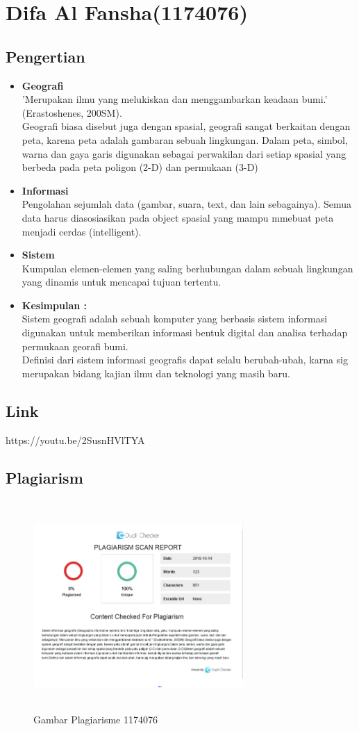 \section{Difa Al Fansha(1174076)}
\subsection{Pengertian}
\begin{itemize}
	\item \textbf{Geografi} \\
	'Merupakan ilmu yang melukiskan dan menggambarkan keadaan bumi.' \\ 
(Erastoshenes, 200SM). \\ 
Geografi biasa disebut juga dengan spasial, geografi sangat berkaitan dengan peta, karena peta adalah gambaran sebuah lingkungan. Dalam peta, simbol, warna dan gaya garis digunakan sebagai perwakilan dari setiap spasial yang berbeda pada peta poligon (2-D) dan permukaan (3-D)
	
	\item \textbf{Informasi} \\
Pengolahan sejumlah data (gambar, suara, text, dan lain sebagainya). Semua data harus diasosiasikan pada object spasial yang mampu mmebuat peta menjadi cerdas (intelligent).

	\item \textbf{Sistem} \\
Kumpulan elemen-elemen yang saling  berhubungan dalam sebuah lingkungan yang dinamis untuk mencapai tujuan tertentu.
	
	\item \textbf{Kesimpulan :} \\
Sistem geografi adalah sebuah komputer yang berbasis sistem informasi digunakan untuk memberikan informasi bentuk digital dan analisa terhadap permukaan georafi bumi.\\
Definisi dari sistem informasi geografis dapat selalu berubah-ubah, karna sig merupakan bidang kajian ilmu dan teknologi yang masih baru.

\end{itemize}

\subsection{Link}
https://youtu.be/2SusnHVlTYA

\subsection{Plagiarism}
\begin{figure}[H]
	\includegraphics[width=8cm, height=8cm]{figures/Tugas1/1174076/1174076.png}
	\centering
	\caption{Gambar Plagiarisme 1174076}
\end{figure}